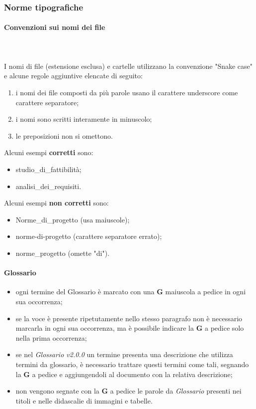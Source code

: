 	\subsubsection{Norme tipografiche}
		\paragraph{Convenzioni sui nomi dei file} \mbox{}\\ \mbox{}\\
		I nomi di file (estensione esclusa) e cartelle utilizzano la convenzione "Snake case\glo" e alcune regole aggiuntive elencate di seguito:
		\begin{enumerate}
			\item i nomi dei file composti da più parole usano il carattere underscore come carattere separatore;
			\item i nomi sono scritti interamente in minuscolo;
			\item le preposizioni non si omettono.
		\end{enumerate}
		Alcuni esempi \textbf{corretti} sono:
		\begin{itemize}
			\item studio\_di\_fattibilità;
			\item analisi\_dei\_requisiti.
		\end{itemize}	 	
		Alcuni esempi \textbf{non corretti} sono: 
		\begin{itemize}
			\item Norme\_di\_progetto (usa maiuscole);
			\item norme-di-progetto (carattere separatore errato);
			\item norme\_progetto (omette "di").
		\end{itemize}
		\paragraph{Glossario}
		\begin{itemize}
			\item ogni termine del Glossario è marcato con una \textbf{G} maiuscola a pedice in ogni sua occorrenza;
			\item se la voce è presente ripetutamente nello stesso paragrafo non è necessario marcarla in ogni sua occorrenza, ma è possibile indicare la \textbf{G} a pedice solo nella prima occorrenza;
			\item se nel \textit{Glossario v2.0.0} un termine presenta una descrizione che utilizza termini da glossario, è necessario trattare questi termini come tali, segnando la \textbf{G} a pedice e aggiungendoli al documento con la relativa descrizione;
			\item non vengono segnate con la \textbf{G} a pedice  le parole da \textit{Glossario} presenti nei titoli e nelle didascalie di immagini e tabelle.
		\end{itemize}			
